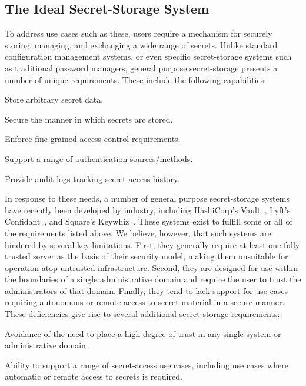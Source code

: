 \subsection{The Ideal Secret-Storage System}

To address use cases such as these, users require a mechanism for
securely storing, managing, and exchanging a wide range of
secrets. Unlike standard configuration management systems, or even
specific secret-storage systems such as traditional password managers,
general purpose secret-storage presents a number of unique
requirements. These include the following capabilities:

\begin{packed_item}
\item Store arbitrary secret data.
\item Secure the manner in which secrets are stored.
\item Enforce fine-grained access control requirements.
\item Support a range of authentication sources/methods.
\item Provide audit logs tracking secret-access history.
\end{packed_item}

In response to these needs, a number of general purpose secret-storage
systems have recently been developed by industry, including
HashiCorp's Vault~\cite{vault}, Lyft's Confidant~\cite{confidant}, and
Square's Keywhiz~\cite{keywhiz}. These systems exist to fulfill some
or all of the requirements listed above. We believe, however, that
such systems are hindered by several key limitations. First, they
generally require at least one fully trusted server as the basis of
their security model, making them unsuitable for operation atop
untrusted infrastructure. Second, they are designed for use within the
boundaries of a single administrative domain and require the user to
trust the administrators of that domain. Finally, they tend to lack
support for use cases requiring autonomous or remote access to secret
material in a secure manner. These deficiencies give rise to several
additional secret-storage requirements:

\begin{packed_item}
\item Avoidance of the need to place a high degree of trust in any
  single system or administrative domain.
\item Ability to support a range of secret-access use cases, including
  use cases where automatic or remote access to secrets is required.
\end{packed_item}

